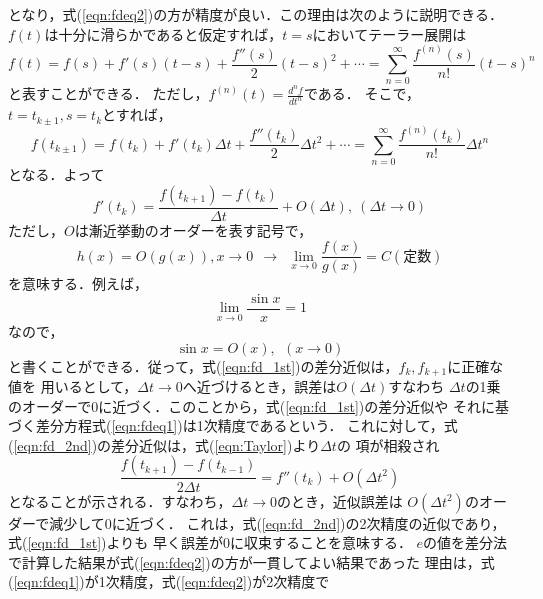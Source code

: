 \documentclass[10pt,a4j,dvipdfmx]{jarticle}
\begin{document}
となり，式(\ref{eqn:fdeq2})の方が精度が良い．この理由は次のように説明できる．
$f(t)$は十分に滑らかであると仮定すれば，$t=s$においてテーラー展開は
\begin{equation}
	f(t)=f(s)+f'(s)(t-s)+\frac{f''(s)}{2}(t-s)^2+\cdots =\sum_{n=0}^\infty \frac{f^{(n)}(s)}{n!}(t-s)^n
	\label{eqn:Taylor}
\end{equation}
と表すことができる．
ただし，$f^{(n)}(t)=\frac{d^nf}{dt^n}$である．
そこで，$t=t_{k\pm 1}, s=t_k$とすれば，
\begin{equation}
	f(t_{k\pm 1})=f(t_k)+f'(t_k)\Delta t+\frac{f''(t_k)}{2}\Delta t ^2+\cdots 
	=\sum_{n=0}^\infty \frac{f^{(n)}(t_k)}{n!}\Delta t^n
	\label{eqn:Taylor}
\end{equation}
となる．よって
\begin{equation}
	f'(t_k)
	=
	\frac{ f(t_{k+1})-f(t_k) }{\Delta t}
	+O(\Delta t), \  (\Delta t \rightarrow 0) 
	\label{eqn:}
\end{equation}
ただし，$O$は漸近挙動のオーダーを表す記号で，
\begin{equation}
	h(x)=O(g(x)), x\rightarrow 0  \ \   \rightarrow \ \ \lim_{x\rightarrow 0} \frac{f(x)}{g(x)}=C(定数)
	\label{eqn:}
\end{equation}
を意味する．例えば，
\begin{equation}
	\lim_{x\rightarrow 0} \frac{\sin x}{x}=1
	\label{eqn:}
\end{equation}
なので，
\begin{equation}
	\sin x = O(x), \ \ (x\rightarrow 0)
	\label{eqn:}
\end{equation}
と書くことができる．従って，式(\ref{eqn:fd_1st})の差分近似は，$f_k, f_{k+1}$に正確な値を
用いるとして，$\Delta t \rightarrow 0$へ近づけるとき，誤差は$O(\Delta t)$すなわち
$\Delta t$の1乗のオーダーで0に近づく．このことから，式(\ref{eqn:fd_1st})の差分近似や
それに基づく差分方程式(\ref{eqn:fdeq1})は1次精度であるという．
これに対して，式(\ref{eqn:fd_2nd})の差分近似は，式(\ref{eqn:Taylor})より$\Delta t$の
項が相殺され
\begin{equation}
	\frac{f(t_{k+1})-f(t_{k-1})}{2\Delta t}=f''(t_k) + O(\Delta t^2)
	\label{eqn:}
\end{equation}
となることが示される．すなわち，$\Delta t \rightarrow 0$のとき，近似誤差は
$O(\Delta t^2)$のオーダーで減少して0に近づく．
これは，式(\ref{eqn:fd_2nd})の2次精度の近似であり，式(\ref{eqn:fd_1st})よりも
早く誤差が0に収束することを意味する．
$e$の値を差分法で計算した結果が式(\ref{eqn:fdeq2})の方が一貫してよい結果であった
理由は，式(\ref{eqn:fdeq1})が1次精度，式(\ref{eqn:fdeq2})が2次精度で
\end{document}
